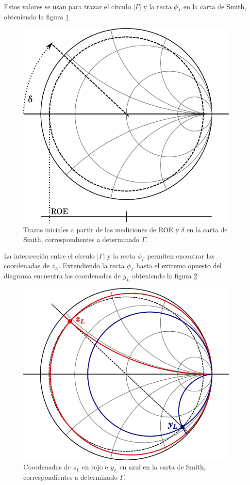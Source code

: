 \documentclass[11pt,a4paper]{article}
\begin{document}
\begin{appendices}
\begin{multicols}{2}
    Estos valores se usan para trazar el círculo $\left|\Gamma\right|$ y la recta $\phi_\Gamma$ en la carta de Smith, obteniendo la figura \ref{fig:smith1}
    \begin{figure}[H]
        \centering
        \includegraphics[width=0.8\linewidth]{Images/smith1.pdf}
        \caption{Trazas iniciales a partir de las mediciones de ROE y $\delta$ en la carta de Smith, correspondientes a determinado $\Gamma$.}
        \label{fig:smith1}
    \end{figure}
    La intersección entre el círculo $\left|\Gamma\right|$ y la recta $\phi_\Gamma$ permiten encontrar las coordenadas de $z_L$. Extendiendo la recta $\phi_\Gamma$ hasta el extremo opuesto del diagrama encuentra las coordenadas de $y_L$ obteniendo la figura \ref{fig:smith2}
    \begin{figure}[H]
        \centering
        \includegraphics[width=0.8\linewidth]{Images/smith3.pdf}
        \caption{Coordenadas de $z_L$ en rojo e $y_L$ en azul en la carta de Smith, correspondientes a determinado $\Gamma$.}
        \label{fig:smith2}
    \end{figure}


\end{multicols}
\end{appendices}
\end{document}
